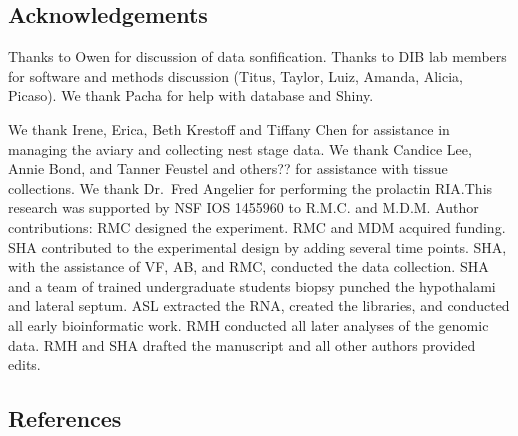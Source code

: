 \hypertarget{acknowledgements}{%
\subsection{Acknowledgements}\label{acknowledgements}}

Thanks to Owen for discussion of data sonfification. Thanks to DIB lab
members for software and methods discussion (Titus, Taylor, Luiz,
Amanda, Alicia, Picaso). We thank Pacha for help with database and
Shiny.

We thank Irene, Erica, Beth Krestoff and Tiffany Chen for assistance in
managing the aviary and collecting nest stage data. We thank Candice
Lee, Annie Bond, and Tanner Feustel and others?? for assistance with
tissue collections. We thank Dr.~Fred Angelier for performing the
prolactin RIA.This research was supported by NSF IOS 1455960 to R.M.C.
and M.D.M. Author contributions: RMC designed the experiment. RMC and
MDM acquired funding. SHA contributed to the experimental design by
adding several time points. SHA, with the assistance of VF, AB, and RMC,
conducted the data collection. SHA and a team of trained undergraduate
students biopsy punched the hypothalami and lateral septum. ASL
extracted the RNA, created the libraries, and conducted all early
bioinformatic work. RMH conducted all later analyses of the genomic
data. RMH and SHA drafted the manuscript and all other authors provided
edits.

\hypertarget{references}{%
\subsection{References}\label{references}}



\newpage

